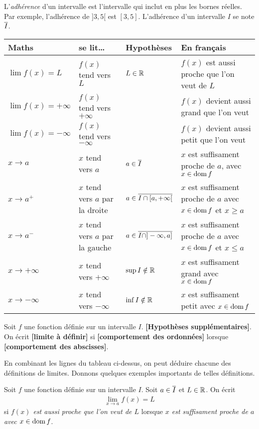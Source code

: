 \documentclass[main.tex]{subfiles}
\begin{document}
L'\emph{adhérence} d'un intervalle est l'intervalle qui inclut en plus les bornes réelles.
Par exemple, l'adhérence de $]3, 5[$ est $[3, 5]$.
L'adhérence d'un intervalle $I$ se note $\overline{I}$.

\begin{tabular}
    {l p{3.2cm}  l p{5cm}}
    \toprule
    Maths & se lit\dots & Hypothèses & En français \\ \midrule
    $\lim f(x) = L$ & $f(x)$ tend vers $L$ & $L \in \mathbb{R}$ & $f(x)$ est aussi proche que l'on veut de $L$ \\
    $\lim f(x) = +\infty$ & $f(x)$ tend vers $+\infty$ & & $f(x)$ devient aussi grand que l'on veut\\
    $\lim f(x) = -\infty$ & $f(x)$ tend vers $-\infty$ & & $f(x)$ devient aussi petit que l'on veut\\
    $x \to a$ & $x$ tend vers $a$ & $a \in \overline{I}$ & $x$ est suffisament proche de $a$, avec $x \in \operatorname{dom} f$\\
    $x \to a^+$ & $x$ tend vers $a$ par la droite & $a \in \overline{I \cap [a, +\infty[}$ & $x$ est suffisament proche de $a$ avec $x \in \operatorname{dom} f$ et $x \geq a$\\
    $x \to a^-$ & $x$ tend vers $a$ par la gauche & $a \in \overline{I \cap ]-\infty, a]}$ & $x$ est suffisament proche de $a$ avec $x \in \operatorname{dom} f$ et $x \leq a$\\
    $x \to +\infty$ & $x$ tend vers $+\infty$ & $\sup I \notin \mathbb{R}$ & $x$ est suffisament grand avec $x \in \operatorname{dom} f$\\
    $x \to -\infty$ & $x$ tend vers $-\infty$ & $\inf I \notin \mathbb{R}$ & $x$ est suffisament petit avec $x \in \operatorname{dom} f$\\
    \bottomrule
\end{tabular}

\begin{definition}
    [Limite]

    Soit $f$ une fonction définie sur un intervalle $I$.
    \textbf{[Hypothèses supplémentaires]}.
    On écrit \textbf{[limite à définir]}
    si \textbf{[comportement des ordonnées]}
    lorsque \textbf{[comportement des abscisses]}.
\end{definition}

En combinant les lignes du tableau ci-dessus,
on peut déduire chacune des définitions de limites.
Donnons quelques exemples importants de telles définitions.

\begin{definition}

    Soit $f$ une fonction définie sur un intervalle $I$.
    Soit $a \in \overline{I}$ et $L \in \mathbb{R}$.
    On écrit
    \begin{align}
        \lim_{x \to a} f(x) = L
    \end{align}
    si \emph{$f(x)$ est aussi proche que l'on veut de $L$}
    lorsque \emph{$x$ est suffisament proche de $a$ avec $x \in \operatorname{dom} f$}.
\end{definition}
\end{document}
